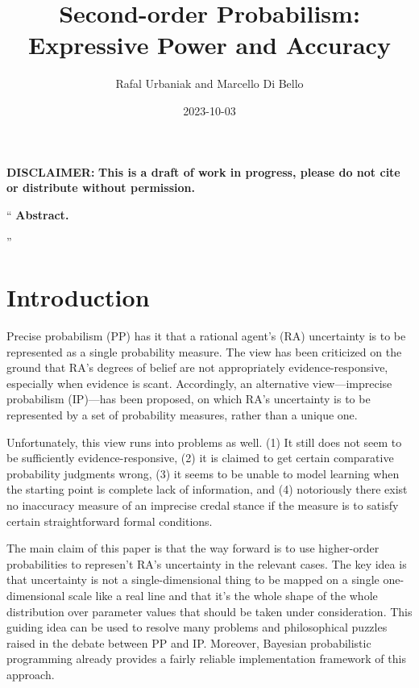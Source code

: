 \documentclass[
  10pt,
  dvipsnames,enabledeprecatedfontcommands]{scrartcl}
\title{Second-order Probabilism: Expressive Power and Accuracy}
\author{Rafal Urbaniak and Marcello Di Bello}
\date{2023-10-03}
\renewenvironment{quote}
{\list{}{\leftmargin=1em\rightmargin=1em}\item[]``}
{''\endlist}
\begin{document}
\maketitle

{
\hypersetup{linkcolor=}
\setcounter{tocdepth}{2}
\tableofcontents
}
\vspace{2cm}

\noindent \textbf{DISCLAIMER:}
\textbf{This is a draft of work in progress, please do not cite or distribute without permission.}

\thispagestyle{empty}

\newpage

\begin{quote} \textbf{Abstract.}  

\end{quote}

\section{Introduction}\label{introduction}

\label{sec:introduction}

Precise probabilism (PP) has it that a rational agent's (RA) uncertainty
is to be represented as a single probability measure. The view has been
criticized on the ground that RA's degrees of belief are not
appropriately evidence-responsive, especially when evidence is scant.
Accordingly, an alternative view---imprecise probabilism (IP)---has been
proposed, on which RA's uncertainty is to be represented by a set of
probability measures, rather than a unique one.

Unfortunately, this view runs into problems as well. (1) It still does
not seem to be sufficiently evidence-responsive, (2) it is claimed to
get certain comparative probability judgments wrong, (3) it seems to be
unable to model learning when the starting point is complete lack of
information, and (4) notoriously there exist no inaccuracy measure of an
imprecise credal stance if the measure is to satisfy certain
straightforward formal conditions.


The main claim of this paper is that the way forward is to use
higher-order probabilities to represen't RA's uncertainty in the
relevant cases. The key idea is that uncertainty is not a
single-dimensional thing to be mapped on a single one-dimensional scale
like a real line and that it's the whole shape of the whole distribution
over parameter values that should be taken under consideration. This
guiding idea can be used to resolve many problems and philosophical
puzzles raised in the debate between PP and IP. Moreover, Bayesian
probabilistic programming already provides a fairly reliable
implementation framework of this approach.
\end{document}
